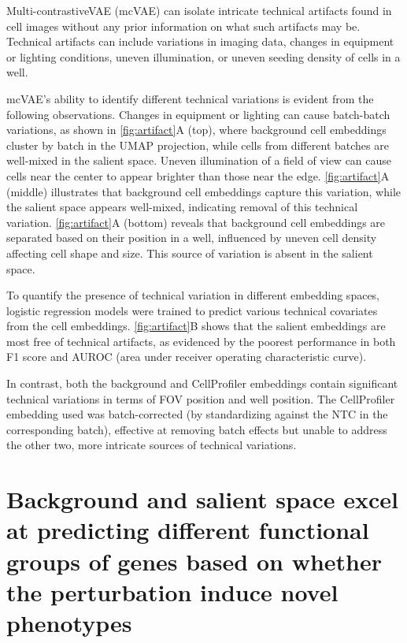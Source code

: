 \documentclass{article}
\begin{document}
Multi-contrastiveVAE (mcVAE) can isolate intricate technical artifacts found in cell images without any prior information on what such artifacts may be. Technical artifacts can include variations in imaging data, changes in equipment or lighting conditions, uneven illumination, or uneven seeding density of cells in a well.

mcVAE's ability to identify different technical variations is evident from the following observations. Changes in equipment or lighting can cause batch-batch variations, as shown in \autoref{fig:artifact}A (top), where background cell embeddings cluster by batch in the UMAP projection, while cells from different batches are well-mixed in the salient space. Uneven illumination of a field of view can cause cells near the center to appear brighter than those near the edge. \autoref{fig:artifact}A (middle) illustrates that background cell embeddings capture this variation, while the salient space appears well-mixed, indicating removal of this technical variation. \autoref{fig:artifact}A (bottom) reveals that background cell embeddings are separated based on their position in a well, influenced by uneven cell density affecting cell shape and size. This source of variation is absent in the salient space.

To quantify the presence of technical variation in different embedding spaces, logistic regression models were trained to predict various technical covariates from the cell embeddings. \autoref{fig:artifact}B shows that the salient embeddings are most free of technical artifacts, as evidenced by the poorest performance in both F1 score and AUROC (area under receiver operating characteristic curve).

In contrast, both the background and CellProfiler embeddings contain significant technical variations in terms of FOV position and well position. The CellProfiler embedding used was batch-corrected (by standardizing against the NTC in the corresponding batch), effective at removing batch effects but unable to address the other two, more intricate sources of technical variations.


\section*{Background and salient space excel at predicting different functional groups of genes based on whether the perturbation induce novel phenotypes}
\end{document}
